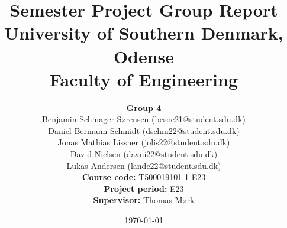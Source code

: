 \title{\textbf{
             Semester Project Group Report}\vspace*{0.5em} \\
      University of Southern Denmark, Odense \vspace*{0.5em}\\
     Faculty of Engineering}
\date{\today\vspace*{16em}}
\maketitle
\begin{center}
    \author{\large \textbf{Group 4}\\\vspace*{3mm}
        \vspace*{3mm}
        \large Benjamin Schmager Sørensen (besoe21@student.sdu.dk)\\
        \vspace*{3mm}
        \large Daniel Bermann Schmidt (dschm22@student.sdu.dk)\\
        \vspace*{3mm}
        \large Jonas Mathias Lissner (jolis22@student.sdu.dk)\\
        \vspace*{3mm}
        \large David Nielsen (davni22@student.sdu.dk)\\
        \vspace*{3mm}
        \large  Lukas Andersen (lande22@student.sdu.dk)\\
        \vspace*{3mm}\vspace*{3em}
        \large \textbf{Course code:} T500019101-1-E23\vspace*{1em}\\
        \large \textbf{Project period:} E23\vspace*{1em}\\
        \large \textbf{Supervisor:} Thomas Mørk\vspace*{1em}\\
    }
\end{center}

\maketitle

\thispagestyle{empty}
\clearpage
{}